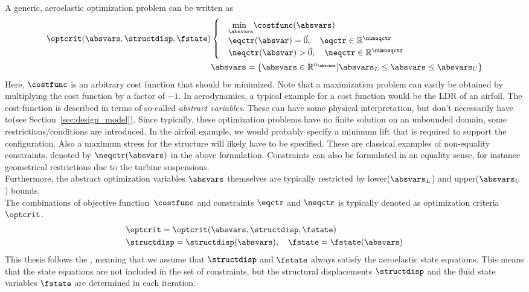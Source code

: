 \documentclass[../main.tex]{subfiles}
\begin{document}
A generic, aeroelastic optimization problem can be written as
\begin{align}
\optcrit(\absvars,\structdisp,\fstate)
&\begin{cases}
&\underset{\absvars}{\text{min }}\costfunc(\absvars) \\%
&\eqctr(\absvar)=\vec{0},~~~\eqctr \in \mathbb{R}^{\numeqctr} \\
&\neqctr(\absvar)>\vec{0},~~~\neqctr \in \mathbb{R}^{\numneqctr} \\
\end{cases} \label{eq:generic_optimization_problem_1}\\
&\absvars = \{ \absvars \in \mathbb{R}^{n_{\absvars}} | \absvars_L \leq \absvars \leq \absvars_U \}\label{eq:generic_optimization_problem_2}
\end{align}
Here,  $\costfunc$ is an arbitrary cost function that should be minimized. Note that a maximization problem can easily be obtained by multiplying the cost function by a factor of $-1$. In aerodynamics, a typical example for a cost function would be the \ac{LDR} of an airfoil. The cost-function is described in terms of so-called \textit{abstract variables}. These can have some physical interpretation, but don't necessarily have to(see Section~\ref{sec:design_model}). Since typically, these optimization problems have no finite solution on an unbounded domain, some restrictions/conditions are introduced. In the airfoil example, we would probably specify a minimum lift that is required to support the configuration. Also a maximum stress for the structure will likely have to be specified. These are classical examples of non-equality constraints, denoted by $\neqctr(\absvars)$ in the above formulation. Constraints can also be formulated in an equality sense, for instance geometrical restrictions due to the turbine suspensions.\\
Furthermore, the abstract optimization variables $\absvars$ themselves are typically restricted by lower($\absvars_L$) and upper($\absvars_U$) bounds.\\
The combinations of objective function~$\costfunc$ and constraints $\eqctr$ and $\neqctr$ is typically denoted as optimization criteria $\optcrit$.
\begin{align}\label{eq:optimization_criteria}
&\optcrit=\optcrit(\absvars,\structdisp,\fstate) \nonumber \\
&\structdisp=\structdisp(\absvars),~~~\fstate=\fstate(\absvars)
\end{align}
This thesis follows the , meaning that we assume that $\structdisp$ and $\fstate$ always satisfy the aeroelastic state equations. This means that the state equations are not included in the set of constraints, but the structural displacements $\structdisp$ and the fluid state variables $\fstate$ are determined in each iteration.
\end{document}

